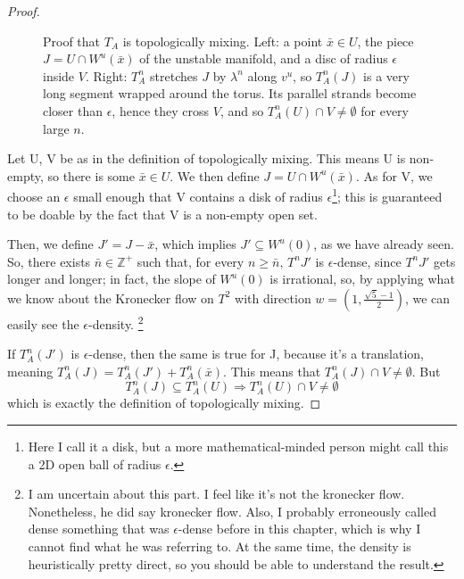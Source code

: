 \begin{proof}
\begin{figure}[ht]
    \caption{Proof that $T_A$ is topologically mixing. Left: a point $\bar{x}\in U$, the piece
    $J=U\cap W^u(\bar{x})$ of the unstable manifold, and a disc of radius $\epsilon$ inside $V$.
    Right: $T_A^n$ stretches $J$ by $\lambda^n$ along $v^u$, so $T_A^n(J)$ is a very long segment
    wrapped around the torus. Its parallel strands become closer than $\epsilon$, hence they cross $V$,
    and so $T_A^n(U)\cap V\neq\emptyset$ for every large $n$.}
    \label{fig:cat_mixing}
\end{figure}

    Let U, V be as in the definition of topologically mixing. This means U is non-empty, so there is some $\bar{x}\in U$. We then define $J=U\cap W^u(\bar{x})$.  As for V, we choose an $\epsilon$ small enough that V contains a disk of radius $\epsilon$\footnote{Here I call it a disk, but a more mathematical-minded person might call this a 2D open ball of radius $\epsilon$.}; this is guaranteed to be doable by the fact that V is a non-empty open set.

    Then, we define $J'=J-\bar{x}$, which implies $J'\subseteq W^u(0)$, as we have already seen. So, there exists $\bar{n}\in\mathbb{Z}^+$ such that, for every $n\geq\bar{n},\,T^nJ'$ is $\epsilon$-dense, since $T^nJ'$ gets longer and longer; in fact, the slope of $W^u(0)$ is irrational, so, by applying what we know about the Kronecker flow on $T^2$ with direction $w=(1, \frac{\sqrt{5}-1}{2})$, we can easily see the $\epsilon$-density. \footnote{I am uncertain about this part. I feel like it's not the kronecker flow. Nonetheless, he did say kronecker flow. Also, I probably erroneously called dense something that was $\epsilon$-dense before in this chapter, which is why I cannot find what he was referring to. At the same time, the density is heuristically pretty direct, so you should be able to understand the result.}

    If $T^n_A(J')$ is $\epsilon$-dense, then the same is true for J, because it's a translation, meaning $T^n_A(J)=T^n_A(J')+T^n_A(\bar{x})$. This means that $T^n_A(J)\cap V\neq\emptyset$. But \begin{equation*}
        T^n_A(J)\subseteq T^n_A(U)\Rightarrow T^n_A(U) \cap V\neq \emptyset
    \end{equation*}
    which is exactly the definition of topologically mixing.
\end{proof}

